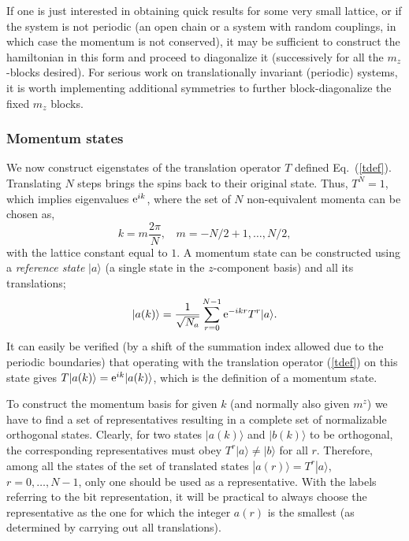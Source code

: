 \documentclass[draft,numberedheadings]{aipproc}
\begin{document}
\noindent
If one is just interested in obtaining quick results for some very small lattice, or if the system is not periodic (an open chain or a system 
with random couplings, in which case the momentum is not conserved), it may be sufficient to construct the hamiltonian in this form and proceed to 
diagonalize it (successively for all the $m_z$-blocks desired). For serious work on translationally invariant (periodic) systems, it is worth implementing 
additional symmetries to further block-diagonalize the fixed $m_z$ blocks.

\subsubsection{Momentum states}
\label{momentum}

We now construct eigenstates of the translation operator $T$ defined Eq.~(\ref{tdef}). Translating $N$ steps brings the spins back to their original state. 
Thus, $T^N=1$, which implies eigenvalues ${\rm e}^{ik}$, where the set of $N$ non-equivalent momenta can be chosen as,
\begin{equation}
k=m\frac{2\pi}{N},~~~~ m=-N/2+1,\ldots,N/2,
\label{momentkm}
\end{equation}
with the lattice constant equal to $1$. A momentum state can be constructed using a {\it reference state} $|a\rangle$ (a single state in the $z$-component 
basis) and all its translations; 
\begin{equation}
|a(k)\rangle = \frac{1}{\sqrt{N_a}} \sum_{r=0}^{N-1} {\rm e}^{-ikr} T^r|a\rangle.
\label{akdef}
\end{equation}
It can easily be verified (by a shift of the summation index allowed due to the periodic boundaries)
that operating with the translation operator (\ref{tdef}) on this state gives $T|a(k)\rangle = {\rm e}^{ik}|a(k)\rangle$, 
which is the definition of a momentum state. 

To construct the momentum basis for given $k$ (and normally also given $m^z$) we have to find a set of representatives resulting in a complete set of 
normalizable orthogonal states. Clearly, for two states $|a(k)\rangle$ and $|b(k)\rangle$ to be orthogonal, the corresponding representatives  must 
obey $T^r|a\rangle \not= |b\rangle$ for all $r$. Therefore, among all the states of the set of translated states $|a(r)\rangle=T^r|a\rangle$, $r=0,\ldots,N-1$, 
only one should be used as a representative. With the labels referring to the bit representation, it will be practical to always choose the representative as the one 
for which the integer $a(r)$ is the smallest (as determined by carrying out all translations).
\end{document}
